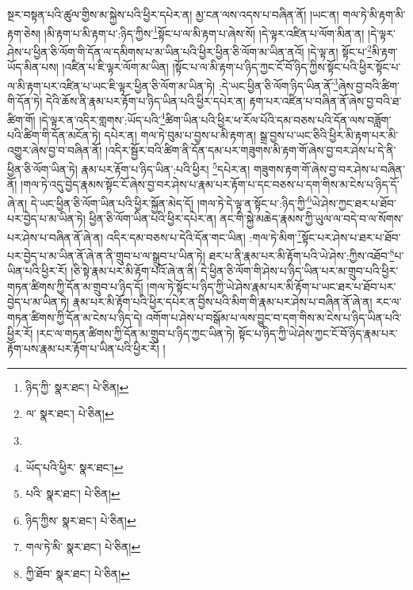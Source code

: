 སྔར་བསྟན་པའི་ཚུལ་གྱིས་མ་སྐྱེས་པའི་ཕྱིར་དཔེར་ན། མྱ་ངན་ལས་འདས་པ་བཞིན་ནོ། །ཡང་ན། གལ་ཏེ་མི་རྟག་མི་རྟག་ཅེས། །མི་རྟག་པ་མི་རྟག་པ་:ཉིད་ཀྱིས་\footnote{ཉིད་ཀྱི་  སྣར་ཐང་།  པེ་ཅིན། }སྟོང་པ་ལ་མི་རྟག་པ་ཞེས་སོ། །དེ་ལྟར་འཛིན་པ་ལོག་མིན་ན། །དེ་ལྟར་ཤེས་པ་ཕྱིན་ཅི་ལོག་གི་དོན་ལ་དམིགས་པ་མ་ཡིན་པའི་ཕྱིར་ཕྱིན་ཅི་ལོག་མ་ཡིན་ནའོ། །དེ་ལྟ་ན། སྟོང་པ་\footnote{ལ་  སྣར་ཐང་།  པེ་ཅིན། }མི་རྟག་ཡོད་མིན་པས། །འཛིན་པ་ཇི་ལྟར་ལོག་མ་ཡིན། །སྟོང་པ་ལ་མི་རྟག་པ་ཉིད་ཀྱང་ངོ་བོ་ཉིད་ཀྱིས་སྟོང་པའི་ཕྱིར་སྟོང་པ་ལ་མི་རྟག་པར་འཛིན་པ་ཡང་ཇི་ལྟར་ཕྱིན་ཅི་ལོག་མ་ཡིན་ཏེ། :དེ་ཡང་ཕྱིན་ཅི་ལོག་ཉིད་ཡིན་ནོ་\footnote{}ཞེས་བྱ་བའི་ཚིག་གི་དོན་ཏེ། དེའི་ཆོས་ནི་རྣམ་པར་རྟོག་པ་ཉིད་ཡིན་པའི་ཕྱིར་དཔེར་ན། རྟག་པར་འཛིན་པ་བཞིན་ནོ་ཞེས་བྱ་བའི་ཐ་ཚིག་གོ། །དེ་ལྟར་ན་འདིར་གླགས་:ཡོད་པའི་\footnote{ཡོད་པའི་ཕྱིར་  སྣར་ཐང་། }ཚིག་ཡིན་པའི་ཕྱིར་ཕ་རོལ་པོའི་དམ་བཅས་པའི་དོན་ལས་བཟློག་པའི་ཚིག་གི་དོན་མངོན་ཏེ། དཔེར་ན། གལ་ཏེ་བུམ་པ་བྱས་པ་མི་རྟག་ན། སྒྲ་བྱས་པ་ཡང་ཅིའི་ཕྱིར་མི་རྟག་པར་མི་འགྱུར་ཞེས་བྱ་བ་བཞིན་ནོ། །འདིར་སྦྱོར་བའི་ཚིག་ནི་དོན་དམ་པར་གཟུགས་མི་རྟག་གོ་ཞེས་བྱ་བར་ཤེས་པ་དེ་ནི་ཕྱིན་ཅི་ལོག་ཡིན་ཏེ། རྣམ་པར་རྟོག་པ་ཉིད་ཡིན་:པའི་ཕྱིར། \footnote{པའི་  སྣར་ཐང་།  པེ་ཅིན། }དཔེར་ན། གཟུགས་རྟག་གོ་ཞེས་བྱ་བར་ཤེས་པ་བཞིན་ནོ། །གལ་ཏེ་འདུ་བྱེད་རྣམས་སྟོང་ངོ་ཞེས་བྱ་བར་ཤེས་པ་རྣམ་པར་རྟོག་པ་དང་བཅས་པ་དག་གིས་མ་ངེས་པ་ཉིད་དོ་ཞེ་ན། དེ་ཡང་ཕྱིན་ཅི་ལོག་ཡིན་པའི་ཕྱིར་སྐྱོན་མེད་དོ། །གལ་ཏེ་དེ་ལྟ་ན་སྟོང་པ་:ཉིད་ཀྱི་\footnote{ཉིད་ཀྱིས་  སྣར་ཐང་།  པེ་ཅིན། }ཡེ་ཤེས་ཀྱང་ཐར་པ་ཐོབ་པར་བྱེད་པ་མ་ཡིན་ཏེ། ཕྱིན་ཅི་ལོག་ཡིན་པའི་ཕྱིར་དཔེར་ན། ནང་གི་སྐྱེ་མཆེད་རྣམས་ཀྱི་ཡུལ་ལ་བདེ་བ་ལ་སོགས་པར་ཤེས་པ་བཞིན་ནོ་ཞེ་ན། འདིར་དམ་བཅས་པ་དེའི་དོན་གང་ཡིན། :གལ་ཏེ་མིག་\footnote{གལ་ཏེ་མི་  སྣར་ཐང་།  པེ་ཅིན། }སྟོང་པར་ཤེས་པ་ཐར་པ་ཐོབ་པར་བྱེད་པ་མ་ཡིན་ནོ་ཞེ་ན་ནི་གྲུབ་པ་ལ་སྒྲུབ་པ་ཡིན་ཏེ། ཐར་པ་ནི་རྣམ་པར་མི་རྟོག་པའི་ཡེ་ཤེས་:ཀྱིས་འཐོབ་\footnote{ཀྱི་ཐོབ་  སྣར་ཐང་།  པེ་ཅིན། }པ་ཡིན་པའི་ཕྱིར་རོ། །ཅི་སྟེ་རྣམ་པར་མི་རྟོག་པའོ་ཞེ་ན་ནི། དེ་ཕྱིན་ཅི་ལོག་གི་ཤེས་པ་ཉིད་ཡིན་པར་མ་གྲུབ་པའི་ཕྱིར་གཏན་ཚིགས་ཀྱི་དོན་མ་གྲུབ་པ་ཉིད་དོ། །གལ་ཏེ་སྟོང་པ་ཉིད་ཀྱི་ཡེ་ཤེས་རྣམ་པར་མི་རྟོག་པ་ཡང་ཐར་པ་ཐོབ་པར་བྱེད་པ་མ་ཡིན་ཏེ། རྣམ་པར་མི་རྟོག་པའི་ཕྱིར་དཔེར་ན་བྱིས་པའི་མིག་གི་རྣམ་པར་ཤེས་པ་བཞིན་ནོ་ཞེ་ན། རང་ལ་གཏན་ཚིགས་ཀྱི་དོན་མ་ངེས་པ་ཉིད་དེ། འགོག་པ་ཤེས་པ་བསྒོམ་པ་ལས་བྱུང་བ་དག་གིས་མ་ངེས་པ་ཉིད་ཡིན་པའི་ཕྱིར་རོ། །རང་ལ་གཏན་ཚིགས་ཀྱི་དོན་མ་གྲུབ་པ་ཉིད་ཀྱང་ཡིན་ཏེ། སྟོང་པ་ཉིད་ཀྱི་ཡེ་ཤེས་ཀྱང་ངོ་བོ་ཉིད་རྣམ་པར་རྟོག་པས་རྣམ་པར་རྟོག་པ་ཡིན་པའི་ཕྱིར་རོ། །
